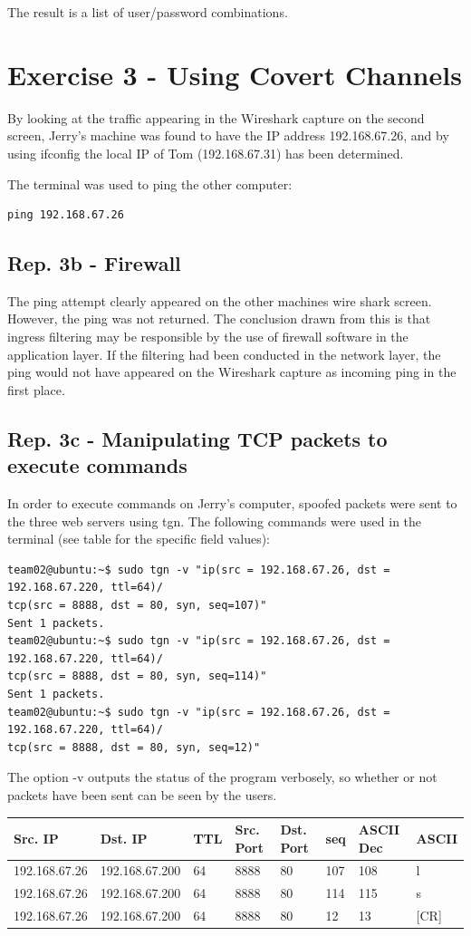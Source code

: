\documentclass{article}
\begin{document}
The result is a list of user/password combinations.

\newpage
\section*{Exercise 3 - Using Covert Channels}

By looking at the traffic appearing in the Wireshark capture on the second screen, Jerry's machine was found to have the IP address 192.168.67.26, and by using ifconfig the local IP of Tom (192.168.67.31) has been determined.

The terminal was used to ping the other computer:
\begin{verbatim}
ping 192.168.67.26
\end{verbatim}

\subsection*{Rep. 3b - Firewall}
The ping attempt clearly appeared on the other machines wire shark screen. However, the ping was not returned. The conclusion drawn from this is that ingress filtering may be responsible by the use of firewall software in the application layer. If the filtering had been conducted in the network layer, the ping would not have appeared on the Wireshark capture as incoming ping in the first place.

\subsection*{Rep. 3c - Manipulating TCP packets to execute commands}
In order to execute commands on Jerry's computer, spoofed packets were sent to the three web servers using tgn. The following commands were used in the terminal (see table for the specific field values):
\begin{verbatim}
team02@ubuntu:~$ sudo tgn -v "ip(src = 192.168.67.26, dst = 192.168.67.220, ttl=64)/
tcp(src = 8888, dst = 80, syn, seq=107)"
Sent 1 packets.
team02@ubuntu:~$ sudo tgn -v "ip(src = 192.168.67.26, dst = 192.168.67.220, ttl=64)/
tcp(src = 8888, dst = 80, syn, seq=114)"
Sent 1 packets.
team02@ubuntu:~$ sudo tgn -v "ip(src = 192.168.67.26, dst = 192.168.67.220, ttl=64)/
tcp(src = 8888, dst = 80, syn, seq=12)"
\end{verbatim}
The option -v outputs the status of the program verbosely, so whether or not packets have been sent can be seen by the users. 

\begin{center}
    \begin{tabular}{ | l | l | l | l | l | l | l | l | }
    \hline
    Src. IP & Dst. IP & TTL & Src. Port & Dst. Port & seq & ASCII Dec & ASCII\\ \hline
    192.168.67.26 & 192.168.67.200 & 64 & 8888 & 80 & 107 & 108 & l\\ \hline
    192.168.67.26 & 192.168.67.200 & 64 & 8888 & 80 & 114 & 115 & s\\ \hline
    192.168.67.26 & 192.168.67.200 & 64 & 8888 & 80 & 12 & 13 & [CR] \\ \hline
    \end{tabular}
\end{center}
\end{document}
